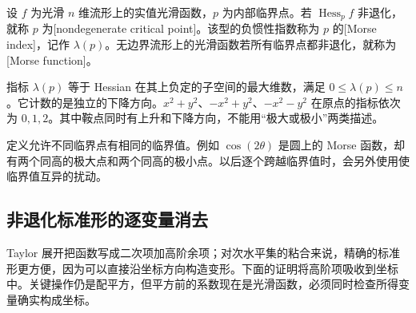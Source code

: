\begin{definition}\label{g2:def:morse-critical-point}
	设 \(f\) 为光滑 \(n\) 维流形上的实值光滑函数，\(p\) 为内部临界点。若 \(\operatorname{Hess}_pf\) 非退化，就称 \(p\) 为[nondegenerate critical point]。该型的负惯性指数称为 \(p\) 的[Morse index]，记作 \(\lambda(p)\)。无边界流形上的光滑函数若所有临界点都非退化，就称为[Morse function]。
\end{definition}

指标 \(\lambda(p)\) 等于 Hessian 在其上负定的子空间的最大维数，满足 \(0\le\lambda(p)\le n\)。它计数的是独立的下降方向。\(x^2+y^2\)、\(-x^2+y^2\)、\(-x^2-y^2\) 在原点的指标依次为 \(0,1,2\)。其中鞍点同时有上升和下降方向，不能用“极大或极小”两类描述。

\ProseParagraphBreak

定义允许不同临界点有相同的临界值。例如 \(\cos(2\theta)\) 是圆上的 Morse 函数，却有两个同高的极大点和两个同高的极小点。以后逐个跨越临界值时，会另外使用使临界值互异的扰动。

\subsection{非退化标准形的逐变量消去}
\label{g2:subsec:1701:02}

Taylor 展开把函数写成二次项加高阶余项；对次水平集的粘合来说，精确的标准形更方便，因为可以直接沿坐标方向构造变形。下面的证明将高阶项吸收到坐标中。关键操作仍是配平方，但平方前的系数现在是光滑函数，必须同时检查所得变量确实构成坐标。

